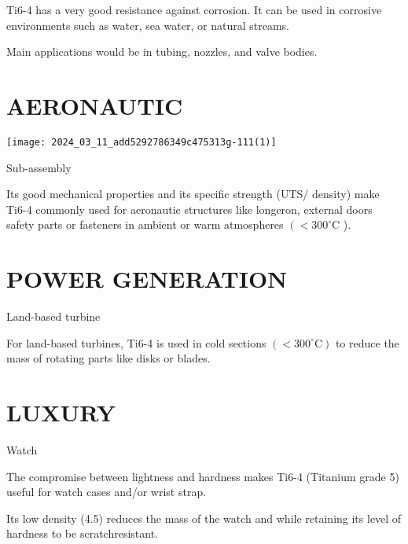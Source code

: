 \documentclass[10pt]{article}
\begin{document}
Ti6-4 has a very good resistance against corrosion. It can be used in corrosive environments such as water, sea water, or natural streams.

Main applications would be in tubing, nozzles, and valve bodies.

\section*{AERONAUTIC}
\begin{center}
\texttt{[image: 2024\_03\_11\_add5292786349c475313g-111(1)]}
\end{center}

Sub-assembly

Its good mechanical properties and its specific strength (UTS/ density) make Ti6-4 commonly used for aeronautic structures like longeron, external doors safety parts or fasteners in ambient or warm atmospheres $\left(<300^{\circ} \mathrm{C}\right.$ ).

\section*{POWER GENERATION}
Land-based turbine

For land-based turbines, Ti6-4 is used in cold sections $\left(<300^{\circ} \mathrm{C}\right)$ to reduce the mass of rotating parts like disks or blades.

\section*{LUXURY}
Watch

The compromise between lightness and hardness makes Ti6-4 (Titanium grade 5) useful for watch cases and/or wrist strap.

Its low density (4.5) reduces the mass of the watch and while retaining its level of hardness to be scratchresistant.
\end{document}
